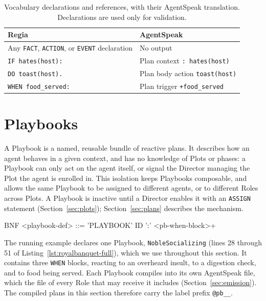 \begin{table}[h]
\centering
\begin{tabular}{|l|l|}
\hline
\textbf{Regia} & \textbf{AgentSpeak} \\
\hline
Any \lstinline|FACT|, \lstinline|ACTION|, or \lstinline|EVENT| declaration & No output \\
\lstinline|IF hates(host):| & Plan context \lstinline|: hates(host)| \\
\lstinline|DO toast(host).| & Plan body action \lstinline|toast(host)| \\
\lstinline|WHEN food_served:| & Plan trigger \lstinline|+food_served| \\
\hline
\end{tabular}
\caption{Vocabulary declarations and references, with their AgentSpeak translation. Declarations are used only for validation.}
\label{tab:vocabulary-mapping}
\end{table}


\section{Playbooks}
\label{sec:playbooks}
 
A Playbook is a named, reusable bundle of reactive plans. It describes how an agent behaves in a given context, and has no knowledge of Plots or phases: a Playbook can only act on the agent itself, or signal the Director managing the Plot the agent is enrolled in. This isolation keeps Playbooks composable, and allows the same Playbook to be assigned to different agents, or to different Roles across Plots. A Playbook is inactive until a Director enables it with an \lstinline|ASSIGN| statement (Section~\ref{sec:plots}); Section~\ref{sec:plans} describes the mechanism.
 
\begin{codeblock}[]{BNF}
    <playbook-def>   ::= 'PLAYBOOK' ID ':' <pb-when-block>+
\end{codeblock}
 
The running example declares one Playbook, \lstinline|NobleSocializing| (lines 28 through 51 of Listing~\ref{lst:royalbanquet-full}), which we use throughout this section. It contains three \lstinline|WHEN| blocks, reacting to an overheard insult, to a digestion check, and to food being served. Each Playbook compiles into its own AgentSpeak file, which the file of every Role that may receive it includes (Section~\ref{sec:emission}). The compiled plans in this section therefore carry the label prefix \lstinline|@pb__|.
 
